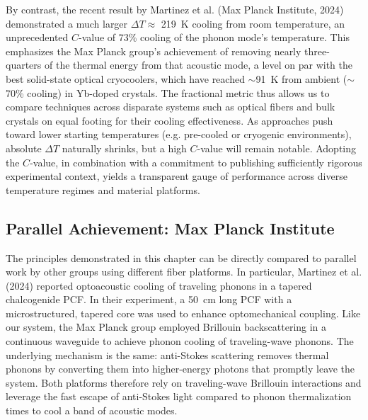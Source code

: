 By contrast, the recent result by Martinez et al. (Max Planck Institute, 2024) \cite{blazquez2024optoacoustic} demonstrated a much larger \(\Delta T \approx\) \SI{219}{\kelvin} cooling from room temperature, an unprecedented \(C\)-value of 73\% cooling of the phonon mode’s temperature. This emphasizes the Max Planck group’s achievement of removing nearly three-quarters of the thermal energy from that acoustic mode, a level on par with the best solid-state optical cryocoolers, which have reached \(\sim\)\SI{91}{\kelvin} from ambient (\(\sim\)70\% cooling) in Yb-doped crystals. \cite{zhang2024experimental} The fractional metric thus allows us to compare techniques across disparate systems such as optical fibers and bulk crystals on equal footing for their cooling effectiveness. As approaches push toward lower starting temperatures (e.g. pre-cooled or cryogenic environments), absolute \(\Delta T\) naturally shrinks, but a high \(C\)-value will remain notable. Adopting the \(C\)-value, in combination with a commitment to publishing sufficiently rigorous experimental context, \cite{zhang2024experimental} yields a transparent gauge of performance across diverse temperature regimes and material platforms.

\subsection{Parallel Achievement: Max Planck Institute}
\label{Cooling:subsec:Parallel Achievement}

The principles demonstrated in this chapter can be directly compared to parallel work by other groups using different fiber platforms. In particular, Martinez et al. (2024) \cite{blazquez2024optoacoustic} reported optoacoustic cooling of traveling phonons in a tapered chalcogenide \ac{PCF}. In their experiment, a \SI{50}{\centi\meter} long PCF with a microstructured, tapered core was used to enhance optomechanical coupling. Like our system, the Max Planck group employed Brillouin backscattering in a continuous waveguide to achieve phonon cooling of traveling-wave phonons. The underlying mechanism is the same: anti-Stokes scattering removes thermal phonons by converting them into higher-energy photons that promptly leave the system. Both platforms therefore rely on traveling-wave Brillouin interactions and leverage the fast escape of anti-Stokes light compared to phonon thermalization times to cool a band of acoustic modes.

